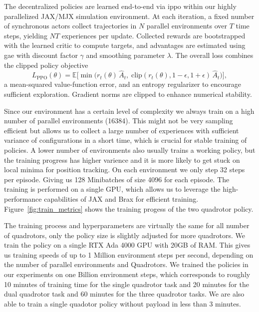 The decentralized policies are learned end-to-end via \gls{ippo} within our highly parallelized JAX/MJX simulation environment. At each iteration, a fixed number of synchronous actors collect trajectories in $N$ parallel environments over $T$ time steps, yielding $NT$ experiences per update. Collected rewards are bootstrapped with the learned critic to compute targets, and advantages are estimated using \gls{gae} with discount factor $\gamma$ and smoothing parameter $\lambda$. The overall loss combines the clipped policy objective
\begin{equation}
L_{\mathrm{PPO}}(\theta) = \mathbb{E}\!\bigl[\min\bigl(r_t(\theta)\,\hat{A}_t,\;\mathrm{clip}(r_t(\theta),1-\epsilon,1+\epsilon)\,\hat{A}_t\bigr)\bigr],
\end{equation}
a mean-squared value-function error, and an entropy regularizer to encourage sufficient exploration. Gradient norms are clipped to enhance numerical stability.

Since our environment has a certain level of complexity we always train on a high number of parallel environments (16384). This might not be very sampling efficient but allows us to collect a large number of experiences with sufficient variance of configurations in a short time, which is crucial for stable training of policies. A lower number of environments also usually trains a working policy, but the training progress has higher varience and it is more likely to get stuck on local minima for position tracking. On each environment we only step 32 steps per episode. Giving us 128 Minibatches of size 4096 for each episode. The training is performed on a single GPU, which allows us to leverage the high-performance capabilities of JAX and Brax for efficient training. Figure~\ref{fig:train_metrics} shows the training progess of the two quadrotor policy. 

The training process and hyperparameters are virtually the same for all number of quadrotors, only the policy size is slightly adjusted for more quadrotors. We train the policy on a single RTX Ada 4000 GPU with 20GB of RAM. This gives us training speeds of up to 1 Million environment steps per second, depending on the number of parallel environments and Quadrotors. We trained the policies in our experiments on one Billion environment steps, which corresponds to roughly 10 minutes of training time for the single quadrotor task and 20 minutes for the dual quadrotor task and 60 minutes for the three quadrotor tasks. We are also able to train a single quadotor policy without payload in less than 3 minutes.

